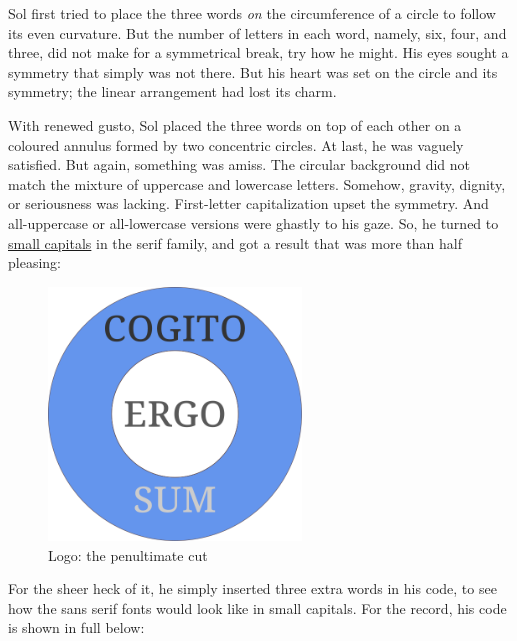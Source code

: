 \documentclass[
  12pt,
  british,
  a4paper,
]{article}
\makeatletter
\newcounter{figno}
\newenvironment{fignos:no-prefix-figure-caption}{
      \caption@ifcompatibility{}{
        \let\oldthefigure\thefigure
        \let\oldtheHfigure\theHfigure
        \renewcommand{\thefigure}{figno:\thefigno}
        \renewcommand{\theHfigure}{figno:\thefigno}
        \stepcounter{figno}
        \captionsetup{labelformat=empty}
      }
    }{
      \caption@ifcompatibility{}{
        \captionsetup{labelformat=default}
        \let\thefigure\oldthefigure
        \let\theHfigure\oldtheHfigure
        \addtocounter{figure}{-1}
      }
    }
\makeatother
\begin{document}
Sol first tried to place the three words \emph{on} the circumference of
a circle to follow its even curvature. But the number of letters in each
word, namely, six, four, and three, did not make for a symmetrical
break, try how he might. His eyes sought a symmetry that simply was not
there. But his heart was set on the circle and its symmetry; the linear
arrangement had lost its charm.

With renewed gusto, Sol placed the three words on top of each other on a
coloured annulus formed by two concentric circles. At last, he was
vaguely satisfied. But again, something was amiss. The circular
background did not match the mixture of uppercase and lowercase letters.
Somehow, gravity, dignity, or seriousness was lacking. First-letter
capitalization upset the symmetry. And all-uppercase or all-lowercase
versions were ghastly to his gaze. So, he turned to
\href{https://en.wikipedia.org/wiki/Small_caps}{small capitals} in the
serif family, and got a result that was more than half pleasing:

\begin{fignos:no-prefix-figure-caption}

\begin{figure}
\centering
\includegraphics[width=0.6\textwidth,height=\textheight]{images/penultimatecut.svg}
\caption{Logo: the penultimate cut}
\end{figure}

\end{fignos:no-prefix-figure-caption}

For the sheer heck of it, he simply inserted three extra words in his
code, to see how the sans serif fonts would look like in small capitals.
For the record, his code is shown in full below:
\end{document}
